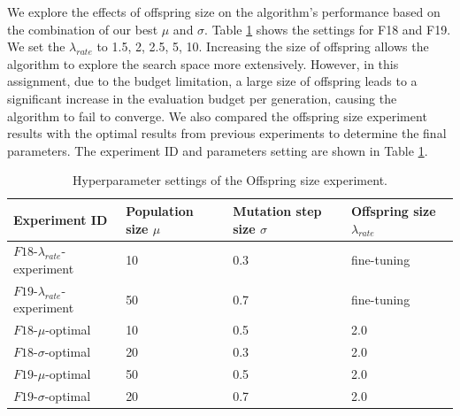 \documentclass{article}
\begin{document}
We explore the effects of offspring size on the algorithm's performance based on the combination of our best $\mu$ and $\sigma$. Table \ref{tab:al-es-os-hyper} shows the settings for F18 and F19. We set the $\lambda_{rate}$ to 1.5, 2, 2.5, 5, 10. Increasing the size of offspring allows the algorithm to explore the search space more extensively. However, in this assignment, due to the budget limitation, a large size of offspring leads to a significant increase in the evaluation budget per generation, causing the algorithm to fail to converge. We also compared the offspring size experiment results with the optimal results from previous experiments to determine the final parameters. The experiment ID and parameters setting are shown in Table \ref{tab:al-es-os-hyper}.


\begin{table}[!ht]
    \centering
    \caption{Hyperparameter settings of the Offspring size experiment.}
    \label{tab:al-es-os-hyper}
    \begin{tabular}{llll}
       \toprule
       \textbf{Experiment ID} & \textbf{Population size $\mu$} & \textbf{Mutation step size $\sigma$} & \textbf{Offspring size $\lambda_{rate}$}\\
       \midrule
       $F18$-$\lambda_{rate}$-experiment & 10 & 0.3 & fine-tuning\\
       $F19$-$\lambda_{rate}$-experiment & 50 & 0.7 & fine-tuning\\
       $F18$-$\mu$-optimal & 10 & 0.5 & 2.0\\
       $F18$-$\sigma$-optimal & 20 & 0.3 & 2.0\\
       $F19$-$\mu$-optimal & 50 & 0.5 & 2.0\\
       $F19$-$\sigma$-optimal & 20 & 0.7 & 2.0\\
       
       \bottomrule
    \end{tabular}
\end{table}
\end{document}
